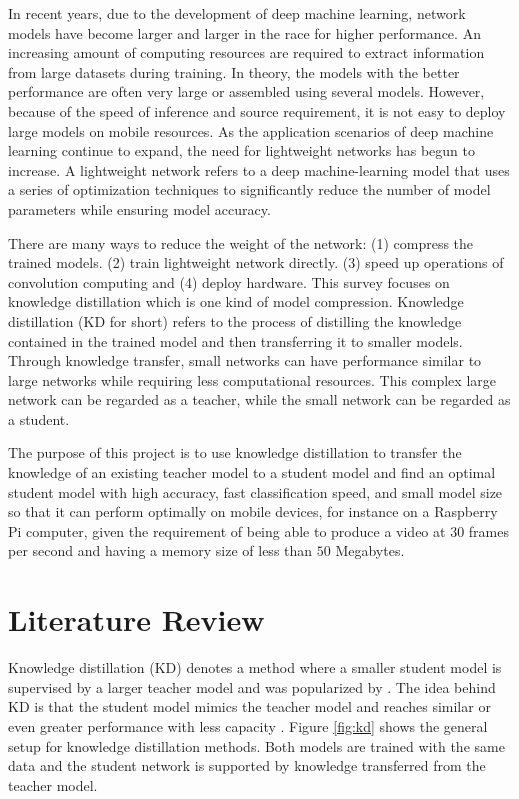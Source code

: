 \documentclass[11pt]{article}
\begin{document}
In recent years, due to the development of deep machine learning, network models have become larger and larger in the race for higher performance. An increasing amount of computing resources are required to extract information from large datasets during training. In theory, the models with the better performance are often very large or assembled using several models. However, because of the speed of inference and source requirement, it is not easy to deploy large models on mobile resources. As the application scenarios of deep machine learning continue to expand, the need for lightweight networks has begun to increase. A lightweight network refers to a deep machine-learning model that uses a series of optimization techniques to significantly reduce the number of model parameters while ensuring model accuracy. 


There are many ways to reduce the weight of the network: (1) compress the trained models. (2) train lightweight network directly. (3) speed up operations of convolution computing and (4) deploy hardware. This survey focuses on knowledge distillation which is one kind of model compression. Knowledge distillation (KD for short) refers to the process of distilling the knowledge contained in the trained model and then transferring it to smaller models. Through knowledge transfer, small networks can have performance similar to large networks while requiring less computational resources. This complex large network can be regarded as a teacher, while the small network can be regarded as a student.


The purpose of this project is to use knowledge distillation to transfer the knowledge of an existing teacher model to a student model and find an optimal student model with high accuracy, fast classification speed, and small model size so that it can perform optimally on mobile devices, for instance on a Raspberry Pi computer, given the requirement of being able to produce a video at 30 frames per second and having a memory size of less than $ 50 $ Megabytes.


\section{Literature Review}
Knowledge distillation (KD) denotes a method where a smaller student model is supervised by a larger teacher model and was popularized by \cite{hintonDistillingKnowledgeNeural2015}. The idea behind KD is that the student model mimics the teacher model and reaches similar or even greater performance with less capacity \cite{gouKnowledgeDistillationSurvey2021}. Figure \ref{fig:kd} shows the general setup for knowledge distillation methods. Both models are trained with the same data and the student network is supported by knowledge transferred from the teacher model.
\end{document}
